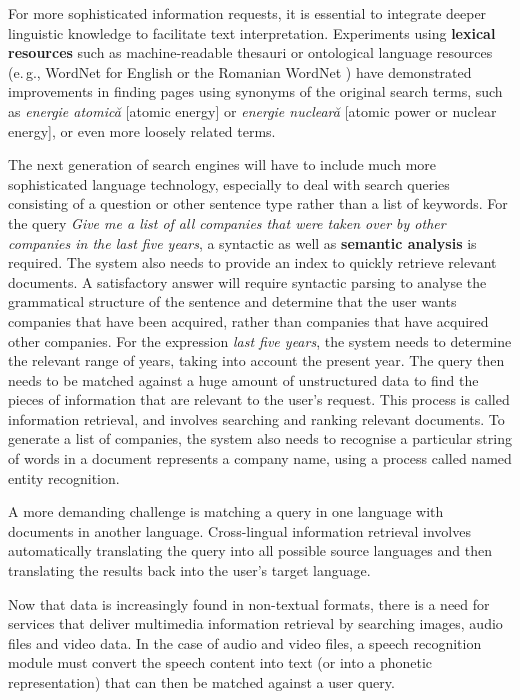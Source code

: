 \begin{multicols}{2}
For more sophisticated information requests, it is essential to integrate deeper linguistic knowledge to facilitate text interpretation. Experiments using \textbf{lexical resources} such as machine-readable thesauri or ontological language resources (e.\,g., WordNet for English or the Romanian WordNet \cite{WN}) have demonstrated improvements in finding pages using synonyms of the original search terms, such as \textit{energie atomică} {[}atomic energy{]} or \textit{energie nucleară} {[}atomic power or nuclear energy{]}, or even more loosely related terms.


The next generation of search engines will have to include much more sophisticated language technology, especially to deal with search queries consisting of a question or other sentence type rather than a list of keywords. For the query \textit{Give me a list of all companies that were taken over by other companies in the last five years}, a syntactic as well as \textbf{semantic analysis} is required. The system also needs to provide an index to quickly retrieve relevant documents. A satisfactory answer will require syntactic parsing to analyse the grammatical structure of the sentence and determine that the user wants companies that have been acquired, rather than companies that have acquired other companies. For the expression \textit{last five years}, the system needs to determine the relevant range of years, taking into account the present year. The query then needs to be matched against a huge amount of unstructured data to find the pieces of information that are relevant to the user’s request. This process is called information retrieval, and involves searching and ranking relevant documents. To generate a list of companies, the system also needs to recognise a particular string of words in a document represents a company name, using a process called named entity recognition.

A more demanding challenge is matching a query in one language with documents in another language. Cross-lingual information retrieval involves automatically translating the query into all possible source languages and then translating the results back into the user's target language.

Now that data is increasingly found in non-textual formats, there is a need for services that deliver multimedia information retrieval by searching images, audio files and video data. In the case of audio and video files, a speech recognition module must convert the speech content into text (or into a phonetic representation) that can then be matched against a user query.


\end{multicols}
